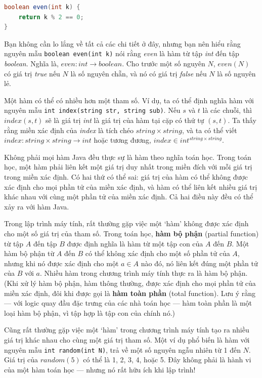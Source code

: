 \begin{lstlisting}[language=Java]
boolean even(int k) {
    return k % 2 == 0;
}
\end{lstlisting}

Bạn không cần lo lắng về tất cả các chi tiết ở đây, nhưng bạn nên hiểu rằng nguyên mẫu \texttt{boolean even(int k)} nói rằng \textit{even} là hàm từ tập \textit{int} đến tập \textit{boolean}. Nghĩa là, $\mathit{even}\colon \mathit{int} \to \mathit{boolean}$. Cho trước một số nguyên $N$, $\mathit{even}(N)$ có giá trị \textit{true} nếu $N$ là số nguyên chẵn, và nó có giá trị \textit{false} nếu $N$ là số nguyên lẻ.

Một hàm có thể có nhiều hơn một tham số. Ví dụ, ta có thể định nghĩa hàm với nguyên mẫu \texttt{int index(string str, string sub)}. Nếu $s$ và $t$ là các chuỗi, thì $\mathit{index}(s,t)$ sẽ là giá trị \textit{int} là giá trị của hàm tại cặp có thứ tự $(s,t)$. Ta thấy rằng miền xác định của \textit{index} là tích chéo $\mathit{string} \times \mathit{string}$, và ta có thể viết $\mathit{index}\colon \mathit{string} \times \mathit{string} \to \mathit{int}$ hoặc tương đương, $\mathit{index} \in \mathit{int}^{\mathit{string} \times \mathit{string}}$.

Không phải mọi hàm Java đều thực sự là hàm theo nghĩa toán học. Trong toán học, một hàm phải liên kết một giá trị duy nhất trong miền đích với mỗi giá trị trong miền xác định. Có hai thứ có thể sai: giá trị của hàm có thể không được xác định cho mọi phần tử của miền xác định, và hàm có thể liên kết nhiều giá trị khác nhau với cùng một phần tử của miền xác định. Cả hai điều này đều có thể xảy ra với hàm Java.

Trong lập trình máy tính, rất thường gặp việc một `hàm' không được xác định cho một số giá trị của tham số. Trong toán học, \textbf{hàm bộ phận} (partial function) từ tập $A$ đến tập $B$ được định nghĩa là hàm từ một tập con của $A$ đến $B$. Một hàm bộ phận từ $A$ đến $B$ có thể không xác định cho một số phần tử của $A$, nhưng khi nó được xác định cho một $a \in A$ nào đó, nó liên kết đúng một phần tử của $B$ với $a$. Nhiều hàm trong chương trình máy tính thực ra là hàm bộ phận. (Khi xử lý hàm bộ phận, hàm thông thường, được xác định cho mọi phần tử của miền xác định, đôi khi được gọi là \textbf{hàm toàn phần} (total function). Lưu ý rằng --- với logic quay đầu đặc trưng của các nhà toán học --- hàm toàn phần là một loại hàm bộ phận, vì tập hợp là tập con của chính nó.)

Cũng rất thường gặp việc một `hàm' trong chương trình máy tính tạo ra nhiều giá trị khác nhau cho cùng một giá trị tham số. Một ví dụ phổ biến là hàm với nguyên mẫu \texttt{int random(int N)}, trả về một số nguyên ngẫu nhiên từ 1 đến $N$. Giá trị của $\mathit{random}(5)$ có thể là 1, 2, 3, 4, hoặc 5. Đây không phải là hành vi của một hàm toán học --- nhưng nó rất hữu ích khi lập trình!

